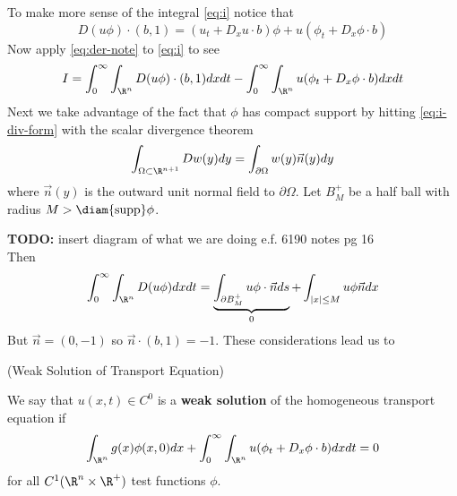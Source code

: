 \documentclass{bkcnotes}
\newcommand{\todo}[1]{{\bf TODO: } #1\\}
\begin{document}
To make more sense of the integral \eqref{eq:i} notice that
\begin{equation}
  \label{eq:der-note}
  D(u\phi)\cdot (b,1) = (u_t + D_xu\cdot b)\phi + u(\phi_t + D_x\phi\cdot b)
\end{equation}
Now apply \eqref{eq:der-note} to \eqref{eq:i} to see
\begin{equation}
  \label{eq:i-div-form}
  I = \int_0^\infty\int_{\R^n} D(u\phi)\cdot (b,1)dxdt 
  - \int_0^\infty\int_{\R^n} u(\phi_t + D_x\phi\cdot b)dxdt
\end{equation}
Next we take advantage of the fact that $\phi$ has compact support by
hitting \eqref{eq:i-div-form} with the scalar divergence theorem
\begin{equation}
  \label{eq:scalar-div-thm}
  \int_{\Omega \subset \R^{n+1}} Dw(y)dy = \int_{\partial \Omega}w(y)\vec{n}(y)dy
\end{equation}
where $\vec{n}(y)$ is the outward unit normal field to $\partial
\Omega$. Let $B_M^+$ be a half ball with radius $M > \diam{\text{supp}}
\phi$.

\todo{insert diagram of what we are doing e.f. 6190 notes pg 16}

Then
\begin{equation}
  \int_0^\infty \int_{\R^n} D(u\phi)dxdt =
  \underbrace{\int_{\partial B_M^+} u\phi\cdot \vec{n}ds}_{0} +
  \int_{|x|\leq M} u\phi \vec{n}dx
\end{equation}
But $\vec{n} = (0,-1)$ so $\vec{n} \cdot (b,1) = -1$. These
considerations lead us to

\begin{ndefn}(Weak Solution of Transport Equation)
  
  We say that $u(x,t) \in C^0$ is a \textbf{weak solution} of the
  homogeneous transport equation if
  \begin{equation}
    \label{eq:weak-sol}
    \int_{\R^n} g(x)\phi(x,0)dx +
    \int_0^\infty\int_{\R^n} u(\phi_t +
    D_x\phi\cdot b)dxdt =
    0
  \end{equation}
  for all $C^1(\R^n \times\R^+)$ test functions $\phi$.
\end{ndefn}
\end{document}
